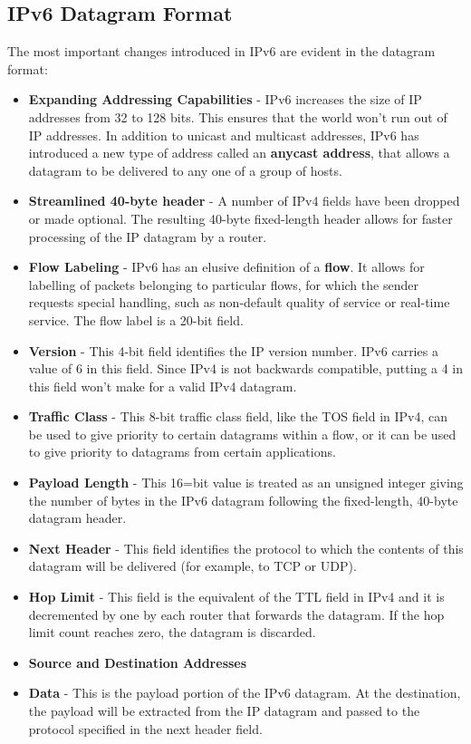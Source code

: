 \subsection{IPv6 Datagram Format}
The most important changes introduced in IPv6 are evident in the datagram format:
\begin{itemize}
\item \textbf{Expanding Addressing Capabilities} - IPv6 increases the size of IP addresses from 32 to 128 bits. This ensures that the world won't run out of IP addresses. In addition to unicast and multicast addresses, IPv6 has introduced a new type of address called an \textbf{anycast address}, that allows a datagram to be delivered to any one of a group of hosts.
\item \textbf{Streamlined 40-byte header} - A number of IPv4 fields have been dropped or made optional. The resulting 40-byte fixed-length header allows for faster processing of the IP datagram by a router.
\item \textbf{Flow Labeling} - IPv6 has an elusive definition of a \textbf{flow}. It allows for labelling of packets belonging to particular flows, for which the sender requests special handling, such as non-default quality of service or real-time service. The flow label is a 20-bit field.
\item \textbf{Version} - This 4-bit field identifies the IP version number. IPv6 carries a value of 6 in this field. Since IPv4 is not backwards compatible, putting a 4 in this field won't make for a valid IPv4 datagram.
\item \textbf{Traffic Class} - This 8-bit traffic class field, like the TOS field in IPv4, can be used to give priority to certain datagrams within a flow, or it can be used to give priority to datagrams from certain applications.
\item \textbf{Payload Length} - This 16=bit value is treated as an unsigned integer giving the number of bytes in the IPv6 datagram following the fixed-length, 40-byte datagram header.
\item \textbf{Next Header} - This field identifies the protocol to which the contents of this datagram will be delivered (for example, to TCP or UDP).
\item \textbf{Hop Limit} - This field is the equivalent of the TTL field in IPv4 and it is decremented by one by each router that forwards the datagram. If the hop limit count reaches zero, the datagram is discarded.
\item \textbf{Source and Destination Addresses}
\item \textbf{Data} - This is the payload portion of the IPv6 datagram. At the destination, the payload will be extracted from the IP datagram and passed to the protocol specified in the next header field.
\end{itemize}

